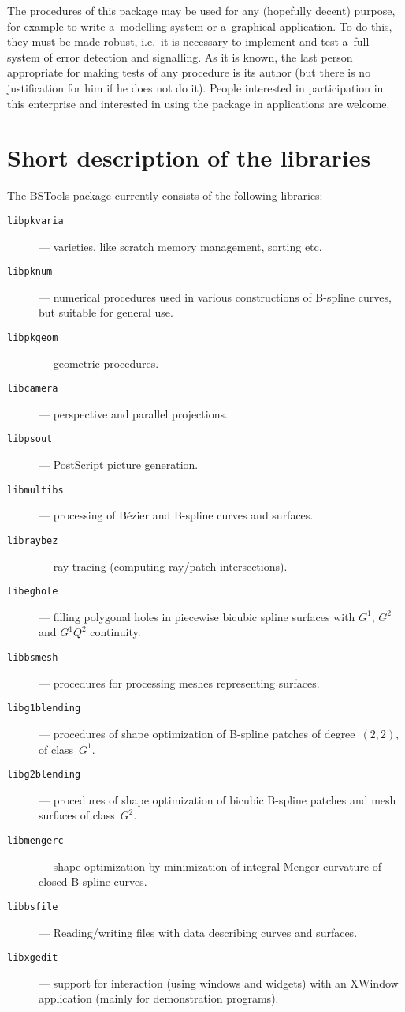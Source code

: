 \vspace{\medskipamount}
The procedures of this package may be used for any (hopefully decent)
purpose, for example to write a~modelling system or a~graphical application.
To do this, they must be made robust, i.e.\ it is necessary to implement
and test a~full system of error detection and signalling.
As it is known, the last person appropriate for making tests of any
procedure is its author (but there is no justification for him if
he does not do it). People interested in participation in this enterprise
and interested in using the package in applications are welcome.


\section{Short description of the libraries}

The BSTools package currently consists of the following libraries:
\begin{description}
\item[\texttt{libpkvaria}]--- varieties, like scratch memory management,
sorting etc.
\item[\texttt{libpknum}]--- numerical procedures used in various constructions
of B-spline curves, but suitable for general use.
\item[\texttt{libpkgeom}]--- geometric procedures.
\item[\texttt{libcamera}]--- perspective and parallel projections.
\item[\texttt{libpsout}]--- PostScript\raisebox{3pt}{\tiny(TM)} picture
generation.
\item[\texttt{libmultibs}]--- processing of B\'{e}zier and B-spline
curves and surfaces.
\item[\texttt{libraybez}]--- ray tracing (computing ray/patch intersections).
\item[\texttt{libeghole}]--- filling polygonal holes in piecewise bicubic
spline surfaces with $G^1$, $G^2$ and $G^1Q^2$ continuity.
\item[\texttt{libbsmesh}]--- procedures for processing meshes representing
surfaces.
\item[\texttt{libg1blending}]--- procedures of shape optimization of
B-spline patches of degree~$(2,2)$, of class~$G^1$.
\item[\texttt{libg2blending}]--- procedures of shape optimization of bicubic
B-spline patches and mesh surfaces of class~$G^2$.
\item[\texttt{libmengerc}]--- shape optimization by minimization of integral
Menger curvature of closed B-spline curves.
\item[\texttt{libbsfile}]--- Reading/writing files with data describing
curves and surfaces.
\item[\texttt{libxgedit}]--- support for interaction (using windows
and widgets) with an XWindow application (mainly for demonstration programs).
\end{description}

